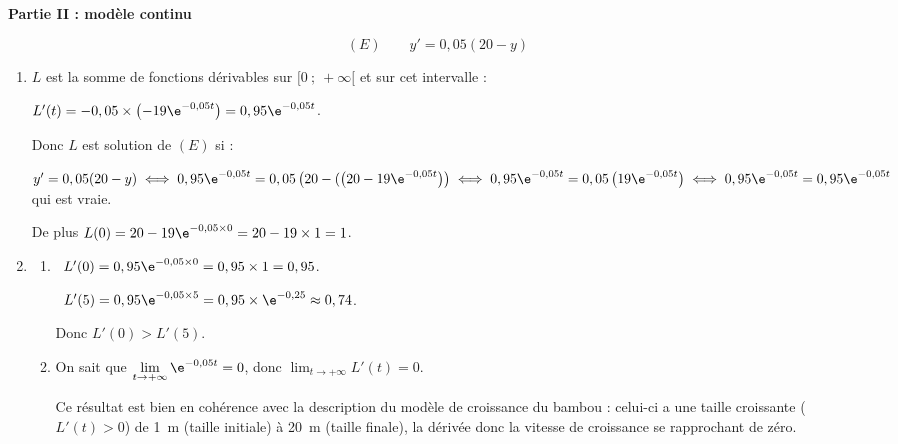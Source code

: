\bigskip

\textbf{Partie II : modèle continu}

\medskip





\[(E) \qquad y' = 0,05(20 - y)\]









\begin{enumerate}
\item 
$L$ est la somme  de fonctions dérivables sur $[0~;~+\infty[$ et sur cet intervalle :

$L'(t) = - 0,05 \times \left(- 19\e^{-0,05t}\right) = 0,95\e^{-0,05t}$.

Donc $L$ est solution de $(E)$ si :

$y' = 0,05(20 - y) \iff 0,95\e^{-0,05t} = 0,05\left(20 - (\left(20 - 19\e^{-0,05t}\right)\right) \iff  0,95\e^{-0,05t}  = 0,05\left (19\e^{-0,05t}\right) \iff  0,95\e^{-0,05t}  =  0,95\e^{-0,05t}$ qui est vraie.

De plus $L(0) = 20 - 19\e^{-0,05\times 0} = 20 - 19\times 1 = 1$.
\item 
	\begin{enumerate}
		\item 
		
\starredbullet~$L'(0) = 0,95\e^{-0,05\times 0} =  0,95 \times 1 =  0,95$.

\starredbullet~$L'(5) = 0,95\e^{-0,05\times 5} =  0,95 \times \e^{-0,25}  \approx  0,74$.

Donc $L'(0) > L'(5)$.
		\item 
		

On sait que $\displaystyle\lim_{t \to + \infty} \e^{-0,05t} = 0$, donc $\displaystyle\lim_{t \to + \infty} L'(t) = 0$.

Ce résultat est bien en cohérence avec la description du modèle de croissance du bambou : celui-ci a une taille croissante ($L'(t) > 0$) de 1~m (taille initiale)  à 20~m (taille finale), la dérivée  donc la vitesse de croissance se rapprochant de zéro.
	\end{enumerate}
\end{enumerate}

\bigskip
